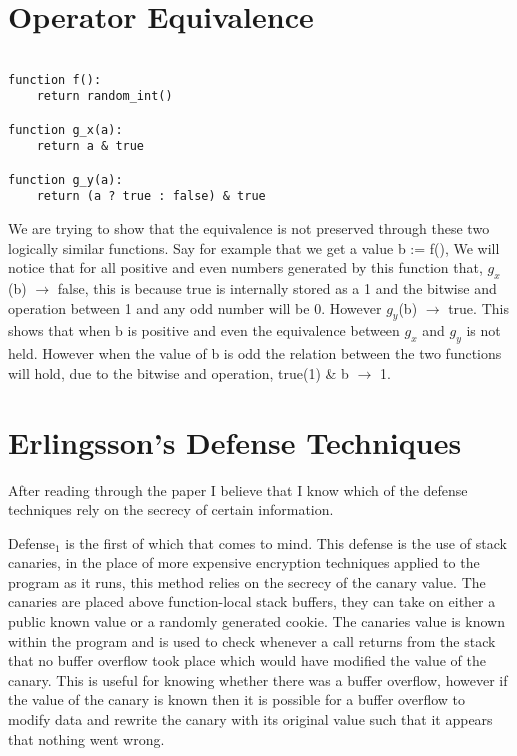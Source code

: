 \documentclass[11pt]{amsart}
\begin{document}
\section{Operator Equivalence}

\begin{verbatim}

function f():
    return random_int()
 
function g_x(a):
    return a & true

function g_y(a):
    return (a ? true : false) & true

\end{verbatim}

We are trying to show that the equivalence is not preserved through these two logically similar functions.  Say for example that we get a value b := f(), We will notice that for all positive and even numbers generated by this function that, $g_x$(b) $\rightarrow$ false, this is because true is internally stored as a 1 and the bitwise and operation between 1 and any odd number will be 0.  However $g_y$(b) $\rightarrow$ true.  This shows that when b is positive and even the equivalence between $g_x$ and $g_y$ is not held.  However when the value of b is odd the relation between the two functions will hold, due to the bitwise and operation, true(1) \& b $\rightarrow$ 1.


\section{Erlingsson's Defense Techniques}

After reading through the paper I believe that I know which of the defense techniques rely on the secrecy of certain information.  

Defense$_1$ is the first of which that comes to mind.  This defense is the use of stack canaries, in the place of more expensive encryption techniques applied to the program as it runs, this method relies on the secrecy of the canary value.  The canaries are placed above function-local stack buffers, they can take on either a public known value or a randomly generated cookie.  The canaries value is known within the program and is used to check whenever a call returns from the stack that no buffer overflow took place which would have modified the value of the canary.  This is useful for knowing whether there was a buffer overflow, however if the value of the canary is known then it is possible for a buffer overflow to modify data and rewrite the canary with its original value such that it appears that nothing went wrong.  
\end{document}
